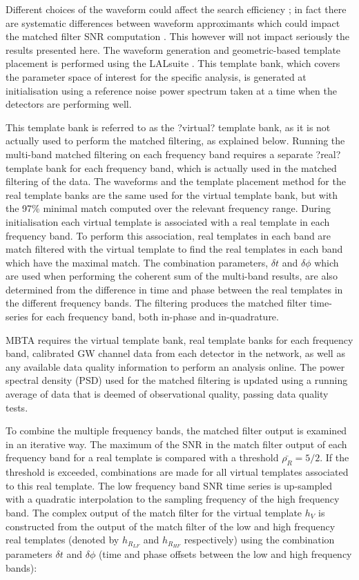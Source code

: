 \documentclass[aps, prd, twocolumn, superscriptaddress, nofootinbib]{revtex4-1}
\begin{document}
Different choices of the waveform could affect the search efficiency \cite{Tito2014}; in fact there are systematic differences between waveform approximants which could impact the matched filter SNR computation \cite{Buonanno2009, Nitz2013}. This however will not impact seriously the results presented here. The waveform generation and geometric-based template placement is performed using the LALsuite \cite{lalsuite}. This template bank, which covers the parameter space of interest for the specific analysis, is generated at initialisation using a reference noise power spectrum taken at a time when the detectors are performing well.

This template bank is referred to as the ?virtual? template bank, as it is not actually used to perform the matched filtering, as explained below.
Running the multi-band matched filtering on each frequency band requires a separate ?real? template bank for each frequency band, which is actually used in the matched filtering of the data. The waveforms and the template placement method for the real template banks are the same used for the virtual template bank, but with the 97\% minimal match computed over the relevant frequency range. During initialisation each virtual template is associated with a real template in each frequency band. To perform this association, real templates in each band are match filtered with the virtual template to find the real templates in each band which have the maximal match. The combination parameters, $\delta t$ and $\delta\phi$ which are used when performing the coherent sum of the multi-band results, are also determined from the difference in time and phase between the real templates in the different frequency bands. The filtering produces the matched filter time-series for each frequency band, both in-phase and in-quadrature. 

MBTA requires the virtual template bank, real template banks for each frequency band, calibrated GW channel data from each detector in the network, as well as any available data quality information to perform an analysis online. The power spectral density (PSD) used for the matched filtering is updated using a running average of data that is deemed of observational quality, passing data quality tests.

To combine the multiple frequency bands, the matched filter output is examined in an iterative way. The maximum of the SNR in the match filter output of each frequency
band for a real template is compared with a threshold $\bar{\rho_R}= 5/2$. If the threshold is exceeded, combinations are made for all virtual templates associated to this real template. The low frequency band SNR time series is up-sampled with a quadratic interpolation to the sampling frequency of the high frequency band.
The complex output of the match filter for the virtual template $h_V$ is constructed from the output of the match filter of the low and high frequency real templates (denoted by $h_{R_{LF}}$ and $h_{R_{HF}}$ respectively) using the combination parameters $\delta t$ and $\delta \phi$ (time and phase offsets between the low and high frequency bands):
\end{document}
